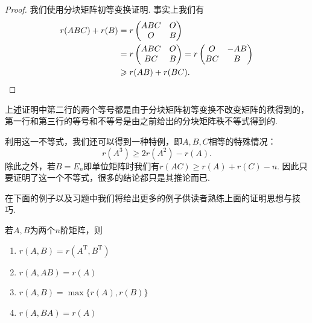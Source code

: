 \begin{enumerate}
          \begin{proof}
              我们使用分块矩阵初等变换证明. 事实上我们有
              \begin{align*}
                  r(ABC)+r(B) & =r\begin{pmatrix}
                                      ABC & O \\ O & B
                                  \end{pmatrix}                 \\
                              & =r\begin{pmatrix}
                                      ABC & O \\ BC & B
                                  \end{pmatrix}=r\begin{pmatrix}
                                                     O & -AB \\ BC & B
                                                 \end{pmatrix} \\
                              & \geqslant r(AB)+r(BC). \qedhere
              \end{align*}
          \end{proof}

          上述证明中第二行的两个等号都是由于分块矩阵初等变换不改变矩阵的秩得到的，第一行和第三行的等号和不等号是由之前给出的分块矩阵秩不等式得到的.

          利用这一不等式，我们还可以得到一种特例，即$A,B,C$相等的特殊情况：
          \[r(A^3) \geqslant 2r(A^2)-r(A).\]
          除此之外，若$B=E_n$即单位矩阵时我们有$r(AC) \geqslant r(A)+r(C)-n$. 因此只要证明了这一个不等式，很多的结论都只是其推论而已.
\end{enumerate}

在下面的例子以及习题中我们将给出更多的例子供读者熟练上面的证明思想与技巧.
\begin{example}{}{}
    若$A,B$为两个$n$阶矩阵，则
    \begin{enumerate}[label=\Alph*.]
        \item $r(A,B)=r(A^\mathrm{T},B^\mathrm{T})$

        \item $r(A,AB)=r(A)$

        \item $r(A,B)=\max\{r(A), r(B)\}$

        \item $r(A,BA)=r(A)$
    \end{enumerate}
\end{example}

